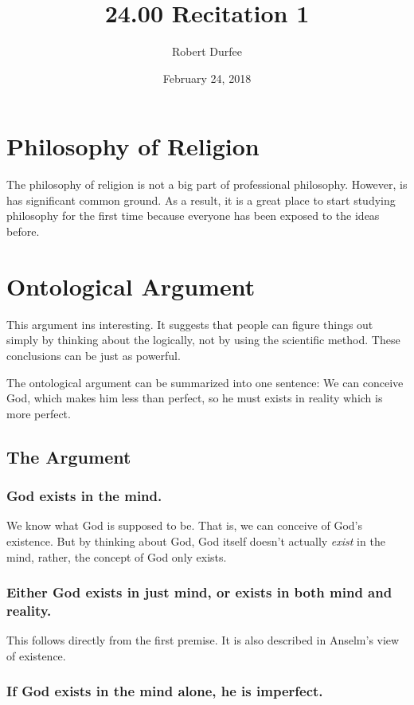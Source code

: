 \documentclass{article}
\title{ 24.00 Recitation 1 }
\author{ Robert Durfee }
\date{ February 24, 2018 }
\begin{document}
\maketitle

\section{ Philosophy of Religion }

The philosophy of religion is not a big part of professional philosophy.
However, is has significant common ground. As a result, it is a great place to
start studying philosophy for the first time because everyone has been exposed
to the ideas before.

\section{Ontological Argument}

This argument ins interesting. It suggests that people can figure things out
simply by thinking about the logically, not by using the scientific method.
These conclusions can be just as powerful.

The ontological argument can be summarized into one sentence: We can conceive
God, which makes him less than perfect, so he must exists in reality which is
more perfect.

\subsection{The Argument}

\subsubsection*{God exists in the mind.}

We know what God is supposed to be. That is, we can conceive of God's existence.
But by thinking about God, God itself doesn't actually \textit{exist} in the
mind, rather, the concept of God only exists.

\subsubsection*{Either God exists in just mind, or exists in both mind and
reality.}

This follows directly from the first premise. It is also described in Anselm's
view of existence.

\subsubsection*{If God exists in the mind alone, he is imperfect.}
\end{document}
